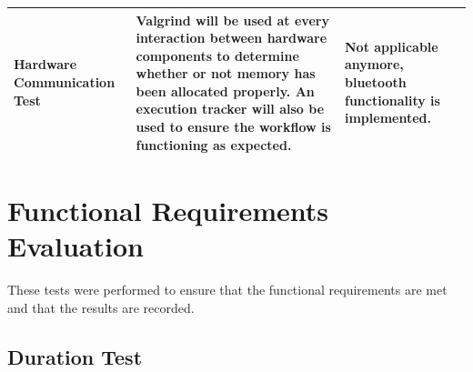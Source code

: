 \documentclass[12pt, titlepage]{article}
\begin{document}
\begin{table} [H]
\begin{tabular}{|p{2.75cm}|p{8cm}|p{4.75cm}|}
  \hline
  Hardware \newline Communication Test                & Valgrind will be used at every interaction between hardware components to determine whether or not memory has been allocated properly. An execution tracker will also be used to ensure the workflow is functioning as expected.                                                                                                          & Not applicable anymore, bluetooth functionality is implemented.             \\
  \hline
\end{tabular}
\end{table}

\section{Functional Requirements Evaluation} \label{FR}
These tests were performed to ensure that the functional requirements are met and that the results are recorded.
\subsection{Duration Test}
\end{document}
